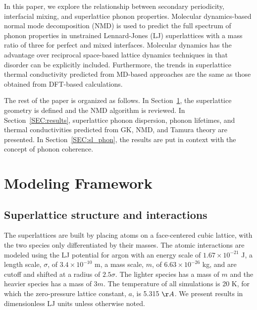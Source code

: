 \documentclass[aps,prb,preprint,preprintnumbers,amsmath,amssymb,floatfix,superscriptaddress]{revtex4}
\begin{document}

In this paper, we explore the relationship between secondary periodicity, interfacial mixing, and superlattice phonon properties. Molecular dynamics-based normal mode decomposition (NMD) is used to predict the full spectrum of phonon properties in unstrained Lennard-Jones (LJ) superlattices with a mass ratio of three for perfect and mixed interfaces. Molecular dynamics has the advantage over reciprocal space-based lattice dynamics techniques in that disorder can be explicitly included. Furthermore, the trends in superlattice thermal conductivity predicted from MD-based approaches are the same as those obtained from DFT-based calculations.\cite{PhysRevB.79.075316,PhysRevB.72.174302,doi:10.1021/nl202186y,PhysRevB.87.140302,Luckyanova16112012} 

The rest of the paper is organized as follows. In Section~\ref{SEC:modeling}, the superlattice geometry is defined and the NMD algorithm is reviewed. In Section~\ref{SEC:results}, superlattice phonon dispersion, phonon lifetimes, and thermal conductivities predicted from GK, NMD, and Tamura theory are presented. In Section~\ref{SEC:sl_phon}, the results are put in context with the concept of phonon coherence.


\section{Modeling Framework}\label{SEC:modeling}
\subsection{Superlattice structure and interactions}\label{SEC:sl_struc}
The superlattices are built by placing atoms on a face-centered cubic lattice, with the two species only differentiated by their masses. The atomic interactions are modeled using the LJ potential for argon with an energy scale of $1.67\times10^{-21}$ J, a length scale, $\sigma$, of $3.4\times10^{-10}$ m, a mass scale, $m$, of $6.63\times10^{-26}$ kg, and are cutoff and shifted at a radius of $2.5\sigma$. The lighter species has a mass of $m$ and the heavier species has a mass of $3m$. The temperature of all simulations is 20 K, for which the zero-pressure lattice constant, $a$, is 5.315 $\AA$.\cite{mcgaugheythesis} We present results in  dimensionless LJ units unless otherwise noted. 
\end{document}
